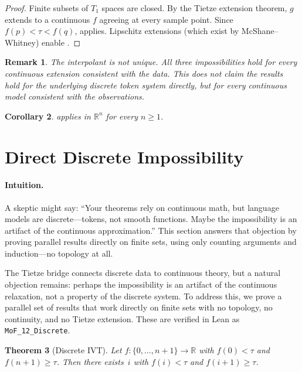 \documentclass[11pt]{article}
\newtheorem{theorem}{Theorem}[section]
\newtheorem{corollary}[theorem]{Corollary}
\newtheorem{remark}[theorem]{Remark}
\newcommand{\R}{\mathbb{R}}
\begin{document}
\begin{proof}
Finite subsets of $T_1$ spaces are closed. By the Tietze extension
theorem, $g$ extends to a continuous $f$ agreeing at every sample point.
Since $f(p) < \tau < f(q)$,  applies. Lipschitz
extensions (which exist by McShane--Whitney) enable
.
\end{proof}

\begin{remark}
The interpolant is not unique. All three impossibilities hold for
\emph{every} continuous extension consistent with the data. This does
not claim the results hold for the underlying discrete token system
directly, but for every continuous model consistent with the observations.
\end{remark}

\begin{corollary}
 applies in $\R^n$ for every $n \geq 1$.
\end{corollary}


\section{Direct Discrete Impossibility}
\label{sec:discrete}

\paragraph{Intuition.}
A skeptic might say: ``Your theorems rely on continuous math, but
language models are discrete---tokens, not smooth functions. Maybe the
impossibility is an artifact of the continuous approximation.'' This
section answers that objection by proving parallel results directly on
finite sets, using only counting arguments and induction---no topology
at all.

The Tietze bridge connects discrete data to continuous theory, but a
natural objection remains: perhaps the impossibility is an artifact of
the continuous relaxation, not a property of the discrete system. To
address this, we prove a parallel set of results that work directly on
finite sets with no topology, no continuity, and no Tietze extension.
These are verified in Lean as \texttt{MoF\_12\_Discrete}.

\begin{theorem}[Discrete IVT]
\label{thm:disc-ivt}
Let $f\colon \{0,\ldots,n\!+\!1\} \to \R$ with $f(0) < \tau$ and
$f(n\!+\!1) \geq \tau$. Then there exists~$i$ with $f(i) < \tau$ and
$f(i\!+\!1) \geq \tau$.
\end{theorem}
\end{document}
